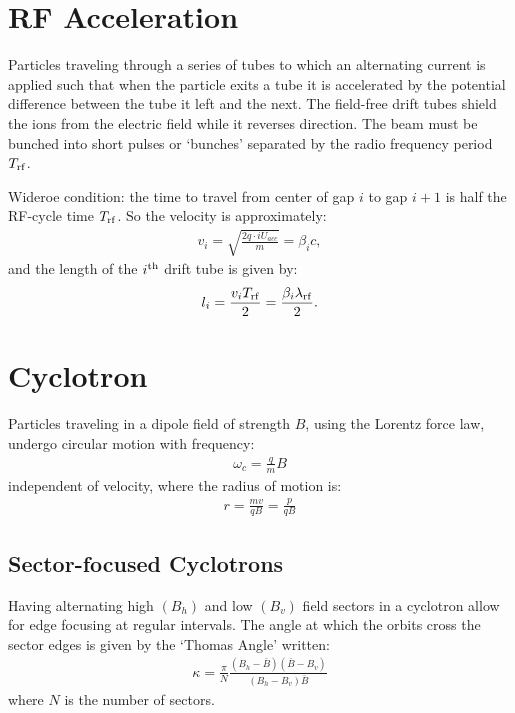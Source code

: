 \documentclass{article}
\numberwithin{equation}{section}
\begin{document}
\section{RF Acceleration}

Particles traveling through a series of tubes to which an alternating current is applied such that when the particle exits a tube it is accelerated by the potential difference between the tube it left and the next. The field-free drift tubes shield the ions from the electric field while it reverses direction. The beam must be bunched into short pulses or `bunches' separated by the radio frequency period $T_{\rm rf}$. 

Wideroe condition: the time to travel from center of gap $i$ to gap $i+1$ is half the RF-cycle time  $T_{\rm rf}$. So the velocity is approximately:
\begin{align}
v_i = \sqrt{ \frac{2 q \cdot i U_{acc}}{m} } = \beta_i c,
\end{align}
and the length of the $i^{\rm th}$ drift tube is given by:
\begin{align}
l_i = \frac{v_i T_{\rm rf}}{2} = \frac{\beta_i \lambda_{\rm rf}}{2}.
\end{align}

\section{Cyclotron}

Particles traveling in a dipole field of strength $B$, using the Lorentz force law, undergo circular motion with frequency:
\begin{align}
\omega_c = \frac{q}{m}B
\end{align}
independent of velocity, where the radius of motion is:
\begin{align}
r = \frac{mv}{qB} = \frac{p}{qB}
\end{align}

\subsection{Sector-focused Cyclotrons}
Having alternating high $(B_h)$ and low $(B_v)$ field sectors in a cyclotron allow for edge focusing at regular intervals. The angle at which the orbits cross the sector edges is given by the `Thomas Angle' written:
\begin{align}
\kappa = \frac{\pi}{N} \frac{(B_h-\bar{B})(\bar{B}-B_v)}{(B_h-B_v)\bar{B}}
\end{align}
where $N$ is the number of sectors.
\end{document}
